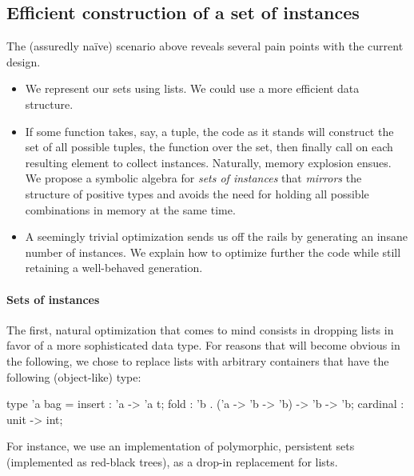\subsection{Efficient construction of a set of instances}
\label{sec:efficient}

The (assuredly naïve) scenario above reveals several pain points with the
current design.
\begin{itemize}
  \item We represent our sets using lists. We could use a more efficient data
    structure.
  \item If some function takes, say, a tuple, the code as it stands will
    construct the set of all possible tuples,  the function over the
    set, then finally call  on each resulting element to collect
    instances.  Naturally, memory explosion ensues. We propose a symbolic
    algebra for \emph{sets of instances} that \emph{mirrors} the structure of
    positive types and avoids the need for holding all possible combinations in
    memory at the same time.
  \item A seemingly trivial optimization sends us off the rails by generating an
    insane number of instances. We explain how to optimize further the code
    while still retaining a well-behaved generation.
\end{itemize}
%

\paragraph{Sets of instances}
The first, natural optimization that comes to mind consists in
dropping lists in favor of a more sophisticated data type. For reasons
that will become obvious in the following, we chose to replace lists
with arbitrary containers that have the following (object-like) type:
\begin{ocamlcode}
type 'a bag = {
  insert : 'a -> 'a t;
  fold : 'b . ('a -> 'b -> 'b) -> 'b -> 'b;
  cardinal : unit -> int;
}
\end{ocamlcode}
For instance, we use an implementation of polymorphic, persistent sets
(implemented as red-black trees), as a drop-in replacement for lists.


